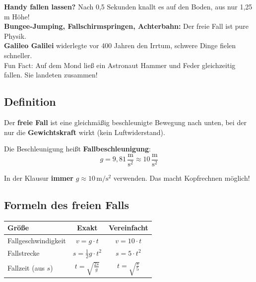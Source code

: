 \documentclass[11pt,a4paper]{article}
\begin{document}
\begin{alltag}
\textbf{Handy fallen lassen?} Nach 0,5 Sekunden knallt es auf den Boden, aus nur 1,25 m Höhe!\\[0.3em]
\textbf{Bungee-Jumping, Fallschirmspringen, Achterbahn:} Der freie Fall ist pure Physik.\\[0.3em]
\textbf{Galileo Galilei} widerlegte vor 400 Jahren den Irrtum, schwere Dinge fielen schneller.\\[0.3em]
Fun Fact: Auf dem Mond ließ ein Astronaut Hammer und Feder gleichzeitig fallen. Sie landeten zusammen!
\end{alltag}

\subsection{Definition}

\begin{merksatz}
Der \textbf{freie Fall} ist eine gleichmäßig beschleunigte Bewegung nach unten, bei der nur die \textbf{Gewichtskraft} wirkt (kein Luftwiderstand).

Die Beschleunigung heißt \textbf{Fallbeschleunigung}:
\[
g = 9{,}81\,\frac{\mathrm{m}}{\mathrm{s}^2} \approx \boxed{10\,\frac{\mathrm{m}}{\mathrm{s}^2}}
\]
\end{merksatz}

\begin{tipp}
In der Klausur \textbf{immer} $g \approx 10\,\mathrm{m/s^2}$ verwenden. Das macht Kopfrechnen möglich!
\end{tipp}

\subsection{Formeln des freien Falls}

\begin{formelbox}
\begin{center}
\renewcommand{\arraystretch}{1.8}
\begin{tabular}{|l|c|c|}
\hline
\rowcolor{lightblue}
\textbf{Größe} & \textbf{Exakt} & \textbf{Vereinfacht} \\
\hline
Fallgeschwindigkeit & $v = g \cdot t$ & $v = 10 \cdot t$ \\
\hline
Fallstrecke & $s = \frac{1}{2} g \cdot t^2$ & $s = 5 \cdot t^2$ \\
\hline
Fallzeit (aus $s$) & $t = \sqrt{\frac{2s}{g}}$ & $t = \sqrt{\frac{s}{5}}$ \\
\hline
\end{tabular}
\end{center}
\end{formelbox}
\end{document}
